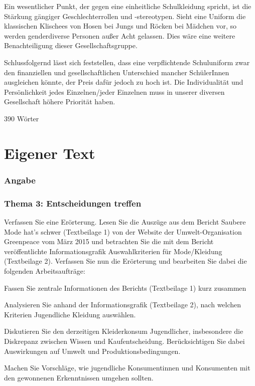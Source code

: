 Ein wesentlicher Punkt, der gegen eine einheitliche Schulkleidung spricht, ist die Stärkung gängiger Geschlechterrollen und -stereotypen. Sieht eine Uniform die klassischen Klischees von Hosen bei Jungs und Röcken bei Mädchen vor, so werden genderdiverse Personen außer Acht gelassen. Dies wäre eine weitere Benachteiligung dieser Gesellschaftsgruppe. 

Schlussfolgernd lässt sich feststellen, dass eine verpflichtende Schuluniform zwar den finanziellen und gesellschaftlichen Unterschied mancher SchülerInnen ausgleichen könnte, der Preis dafür jedoch zu hoch ist. Die Individualität und Persönlichkeit jedes Einzelnen/jeder Einzelnen muss in unserer diversen Gesellschaft höhere Priorität haben. 

390 Wörter 

\section{Eigener Text}
\subsubsection{Angabe}
\subsubsection{Thema 3: Entscheidungen treffen }
Verfassen Sie eine Erörterung.
Lesen Sie die Auszüge aus dem Bericht Saubere Mode hat’s schwer (Textbeilage 1) von der
Website der Umwelt-Organisation Greenpeace vom März 2015 und betrachten Sie die mit dem
Bericht veröffentlichte Informationsgrafik Auswahlkriterien für Mode/Kleidung (Textbeilage 2).
Verfassen Sie nun die Erörterung und bearbeiten Sie dabei die folgenden Arbeitsaufträge:

\begin{compactitem}
    \item Fassen Sie zentrale Informationen des Berichts (Textbeilage 1) kurz zusammen
    \item Analysieren Sie anhand der Informationsgrafik (Textbeilage 2), nach welchen Kriterien
    Jugendliche Kleidung auswählen. 
    \item Diskutieren Sie den derzeitigen Kleiderkonsum Jugendlicher, insbesondere die Diskrepanz
    zwischen Wissen und Kaufentscheidung. Berücksichtigen Sie dabei Auswirkungen auf Umwelt und Produktionsbedingungen.
    \item Machen Sie Vorschläge, wie jugendliche Konsumentinnen und Konsumenten mit den gewonnenen Erkenntnissen umgehen sollten.
\end{compactitem}

